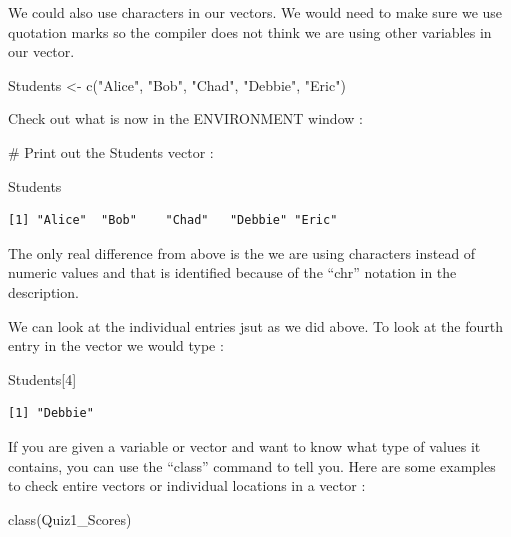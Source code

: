 \documentclass[
  letterpaper,
  DIV=11,
  numbers=noendperiod]{scrreprt}
\newenvironment{Shaded}{\begin{snugshade}}{\end{snugshade}}
\newcommand{\CommentTok}[1]{\textcolor[rgb]{0.37,0.37,0.37}{#1}}
\newcommand{\DecValTok}[1]{\textcolor[rgb]{0.68,0.00,0.00}{#1}}
\newcommand{\FunctionTok}[1]{\textcolor[rgb]{0.28,0.35,0.67}{#1}}
\newcommand{\NormalTok}[1]{\textcolor[rgb]{0.00,0.23,0.31}{#1}}
\newcommand{\OtherTok}[1]{\textcolor[rgb]{0.00,0.23,0.31}{#1}}
\newcommand{\StringTok}[1]{\textcolor[rgb]{0.13,0.47,0.30}{#1}}
\begin{document}
We could also use characters in our vectors. We would need to make sure
we use quotation marks so the compiler does not think we are using other
variables in our vector.

\begin{Shaded}
\begin{Highlighting}[]
\NormalTok{Students }\OtherTok{\textless{}{-}} \FunctionTok{c}\NormalTok{(}\StringTok{"Alice"}\NormalTok{, }\StringTok{"Bob"}\NormalTok{, }\StringTok{"Chad"}\NormalTok{, }\StringTok{"Debbie"}\NormalTok{, }\StringTok{"Eric"}\NormalTok{)}
\end{Highlighting}
\end{Shaded}

Check out what is now in the ENVIRONMENT window :

\begin{Shaded}
\begin{Highlighting}[]
\CommentTok{\# Print out the Students vector :}

\NormalTok{Students}
\end{Highlighting}
\end{Shaded}

\begin{verbatim}
[1] "Alice"  "Bob"    "Chad"   "Debbie" "Eric"  
\end{verbatim}

The only real difference from above is the we are using characters
instead of numeric values and that is identified because of the ``chr''
notation in the description.

We can look at the individual entries jsut as we did above. To look at
the fourth entry in the vector we would type :

\begin{Shaded}
\begin{Highlighting}[]
\NormalTok{Students[}\DecValTok{4}\NormalTok{]}
\end{Highlighting}
\end{Shaded}

\begin{verbatim}
[1] "Debbie"
\end{verbatim}

If you are given a variable or vector and want to know what type of
values it contains, you can use the ``class'' command to tell you. Here
are some examples to check entire vectors or individual locations in a
vector :

\begin{Shaded}
\begin{Highlighting}[]
\FunctionTok{class}\NormalTok{(Quiz1\_Scores)}
\end{Highlighting}
\end{Shaded}
\end{document}
